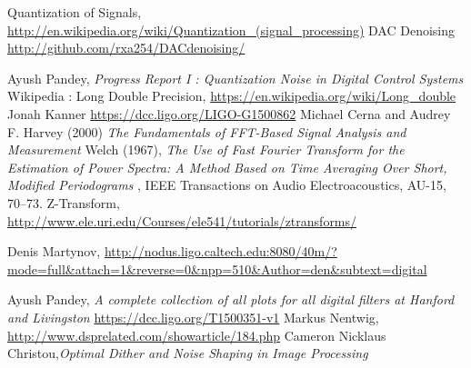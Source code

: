 \documentclass[colorlinks=true,pdfstartview=FitV,linkcolor=blue,
            citecolor=red,urlcolor=magenta]{ligodoc}
\begin{document}
\begin{thebibliography}{100}
 Quantization of Signals, \url{http://en.wikipedia.org/wiki/Quantization_(signal_processing)}
 DAC Denoising \url{http://github.com/rxa254/DACdenoising/}

 Ayush Pandey, \emph{Progress Report I : Quantization Noise in Digital Control Systems} 
 Wikipedia : Long Double Precision, \url{https://en.wikipedia.org/wiki/Long_double}
 Jonah Kanner \url{https://dcc.ligo.org/LIGO-G1500862}
 Michael Cerna and Audrey F. Harvey (2000) \emph{The Fundamentals of FFT-Based Signal Analysis and Measurement}
 Welch (1967),  \emph{The Use of Fast Fourier Transform for the Estimation of Power Spectra: A Method Based on Time Averaging Over Short, Modified Periodograms} , IEEE Transactions on Audio Electroacoustics, AU-15, 70–73.
 Z-Transform, \url{http://www.ele.uri.edu/Courses/ele541/tutorials/ztransforms/}

 Denis Martynov, \url{http://nodus.ligo.caltech.edu:8080/40m/?mode=full&attach=1&reverse=0&npp=510&Author=den&subtext=digital}  



 Ayush Pandey, \emph{A complete collection of all plots for all digital filters at Hanford and Livingston}
\url{https://dcc.ligo.org/T1500351-v1}
 Markus Nentwig, \url{http://www.dsprelated.com/showarticle/184.php}
Cameron Nicklaus Christou,\emph{Optimal Dither and Noise Shaping in Image Processing}
\end{thebibliography}      
\printbibliography
\end{document}
